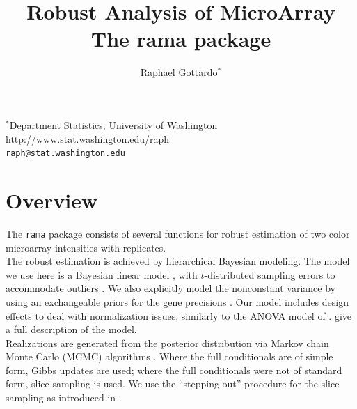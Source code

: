 \documentclass[11pt]{article}
\begin{document}
\title{\bf Robust Analysis of MicroArray\\
The rama package}
\author{Raphael Gottardo$^*$}

\maketitle

\begin{center}
  $^*$Department Statistics, University of Washington\\
  \url{http://www.stat.washington.edu/raph}\\
  {\tt raph@stat.washington.edu}
\end{center}

\tableofcontents


\section{Overview}

The {\tt rama} package consists of several functions for
robust estimation of two color microarray intensities with replicates.\\  

The robust estimation is achieved by hierarchical Bayesian modeling.
The model we use here is a Bayesian linear model \cite{bib:lindley72}, 
with $t$-distributed sampling errors to accommodate outliers \cite{bib:besag_higdon99}.
We also explicitly model the nonconstant variance by using an exchangeable priors for the gene precisions .
Our model includes design effects to deal with normalization issues, similarly to the ANOVA model of . 
 give a full description of the model. \\

Realizations are generated from the posterior distribution
via Markov chain Monte Carlo (MCMC) algorithms \cite{bib:gelfand90,bib:brooks98}.  
Where the full conditionals are of simple form, Gibbs updates are used; where the full conditionals were not of standard
form, slice sampling is used. We use the ``stepping out'' procedure for the slice sampling as introduced in . \\
\end{document}

